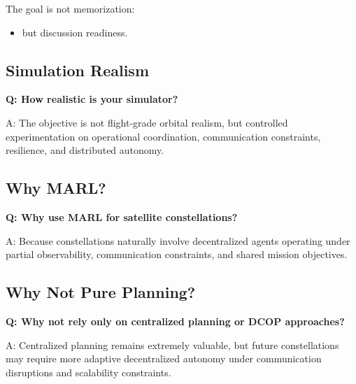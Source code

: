 \documentclass[10pt,a4paper,twocolumn]{article}
\begin{document}
The goal is not memorization:
\begin{itemize}
    \item but discussion readiness.
\end{itemize}


\subsection{Simulation Realism}

\begin{questionbox}
    \textbf{Q: How realistic is your simulator?}

    A: The objective is not flight-grade orbital realism, but controlled experimentation on operational coordination, communication constraints, resilience, and distributed autonomy.
\end{questionbox}


\subsection{Why MARL?}

\begin{questionbox}
    \textbf{Q: Why use MARL for satellite constellations?}

    A: Because constellations naturally involve decentralized agents operating under partial observability, communication constraints, and shared mission objectives.
\end{questionbox}


\subsection{Why Not Pure Planning?}

\begin{questionbox}
    \textbf{Q: Why not rely only on centralized planning or DCOP approaches?}

    A: Centralized planning remains extremely valuable, but future constellations may require more adaptive decentralized autonomy under communication disruptions and scalability constraints.
\end{questionbox}
\end{document}
